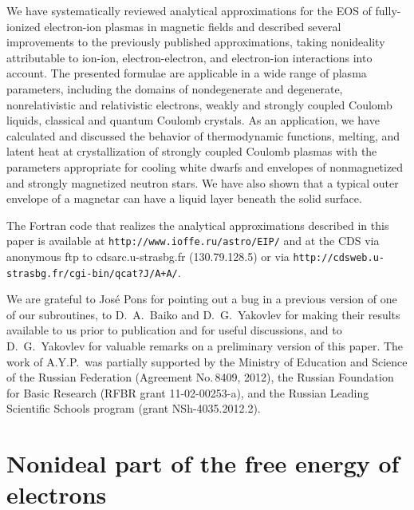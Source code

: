 \documentclass[traditabstract]{aa}
\begin{document}
We have systematically reviewed analytical approximations for
the EOS of fully-ionized electron-ion plasmas in magnetic
fields and described several improvements to the previously
published approximations, taking nonideality
attributable to ion-ion, electron-electron, and electron-ion
interactions into account. The presented formulae are applicable in a
wide range of plasma parameters, including the domains of
nondegenerate and degenerate, nonrelativistic and
relativistic electrons, weakly and strongly coupled Coulomb
liquids, classical and quantum Coulomb crystals. As an
application, we have calculated and discussed the behavior
of thermodynamic functions, melting, 
and latent heat at crystallization of strongly coupled
Coulomb plasmas with the parameters appropriate for cooling
white dwarfs and envelopes of nonmagnetized and strongly
magnetized neutron stars. We have also shown that a typical
outer envelope of a magnetar can have a liquid layer beneath
the solid surface.

The Fortran code that realizes the analytical approximations
described in this paper is available at
\texttt{http://www.ioffe.ru/astro/EIP/} and at the CDS via
anonymous ftp to cdsarc.u-strasbg.fr (130.79.128.5) or via
\texttt{http://cdsweb.u-strasbg.fr/cgi-bin/qcat?J/A+A/}.

\begin{acknowledgements}
We are grateful 
to Jos\'e Pons for pointing out a bug in a previous version
of one of our subroutines,
to D.~A.~Baiko and D.~G.~Yakovlev for making
their results available to us prior to publication
and for useful discussions,
and to D.~G.~Yakovlev for valuable
remarks on a preliminary version of this paper.
The work of A.Y.P.\ was partially supported 
by the
Ministry of Education and Science of the Russian Federation
(Agreement No.\,8409, 2012),
the Russian Foundation for Basic Research (RFBR grant
11-02-00253-a), and the Russian Leading Scientific
Schools program (grant NSh-4035.2012.2). 
\end{acknowledgements}

\appendix

\section{Nonideal part of the free energy
of electrons}
\label{sect:Fee}
\end{document}
